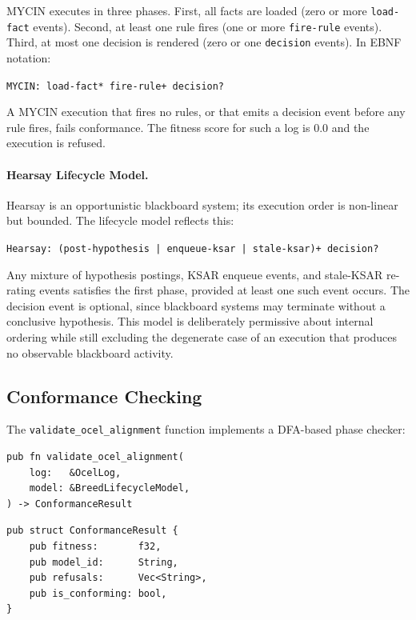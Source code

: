 MYCIN executes in three phases. First, all facts are loaded (zero or more \texttt{load-fact} events). Second, at least one rule fires (one or more \texttt{fire-rule} events). Third, at most one decision is rendered (zero or one \texttt{decision} events). In EBNF notation:

\begin{center}
\texttt{MYCIN: load-fact* \textrightarrow{} fire-rule+ \textrightarrow{} decision?}
\end{center}

A MYCIN execution that fires no rules, or that emits a decision event before any rule fires, fails conformance. The fitness score for such a log is 0.0 and the execution is refused.

\paragraph{Hearsay Lifecycle Model.}

Hearsay is an opportunistic blackboard system; its execution order is non-linear but bounded. The lifecycle model reflects this:

\begin{center}
\texttt{Hearsay: (post-hypothesis | enqueue-ksar | stale-ksar)+ \textrightarrow{} decision?}
\end{center}

Any mixture of hypothesis postings, KSAR enqueue events, and stale-KSAR re-rating events satisfies the first phase, provided at least one such event occurs. The decision event is optional, since blackboard systems may terminate without a conclusive hypothesis. This model is deliberately permissive about internal ordering while still excluding the degenerate case of an execution that produces no observable blackboard activity.

\subsection{Conformance Checking}

The \texttt{validate\_ocel\_alignment} function implements a DFA-based phase checker:

\begin{verbatim}
pub fn validate_ocel_alignment(
    log:   &OcelLog,
    model: &BreedLifecycleModel,
) -> ConformanceResult
\end{verbatim}

\begin{verbatim}
pub struct ConformanceResult {
    pub fitness:       f32,
    pub model_id:      String,
    pub refusals:      Vec<String>,
    pub is_conforming: bool,
}
\end{verbatim}


